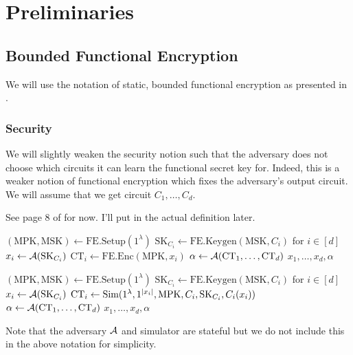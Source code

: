 \newcommand{\MPK}{\text{MPK}}
\newcommand{\MSK}{\text{MSK}}
\newcommand{\SK}{\text{SK}}
\newcommand{\Enc}{\texttt{Enc}}
\newcommand{\Dec}{\texttt{Dec}}
\newcommand{\FEEnc}{\text{FE.Enc}}
\newcommand{\FEDec}{\text{FE.Dec}}
\newcommand{\FESetup}{\text{FE.Setup}}
\newcommand{\FEKeygen}{\text{FE.Keygen}}
\newcommand{\FECT}{\text{CT}}


\section{Preliminaries}
\subsection{Bounded Functional Encryption}
We will use the notation of static, bounded functional encryption as presented in
\cite{agrawal2017functional}.

\subsubsection*{Security}
We will slightly weaken the security notion such that the adversary does not choose
which circuits it can learn the functional secret key for. Indeed, this is a weaker notion of functional encryption
which fixes the adversary's output circuit.
We will assume that we get circuit $C_1, \dots, C_d$.

See page 8 of \cite{agrawal2017functional} for now. I'll put in the actual definition later.


\begin{minipage}{0.46\textwidth}
\begin{algorithm}[H]
    \centering
    \caption{$\ExpReal(1^\lambda)$}
    \begin{algorithmic}[1]
        \State $(\MPK, \MSK) \gets \FESetup(1^\lambda)$
				\State $\SK_{C_i} \gets \FEKeygen(\MSK, C_i)$ for $i \in [d]$
				\State $x_i \gets \advers(\SK_{C_i})$
				\State $\FECT_i \gets \FEEnc(\MPK, x_i)$
				\State $\alpha \gets \advers(\FECT_1, \dots, \FECT_d)$
				\State \Return $x_1, \dots, x_d, \alpha$
    \end{algorithmic}
		\label{alg:FEExprReal}
\end{algorithm}
\end{minipage}
\hfill
\begin{minipage}{0.46\textwidth}
\begin{algorithm}[H]
    \centering
    \caption{$\ExpSim(1^\lambda)$}\label{alg:FEExprSim}
    \begin{algorithmic}[1]
        \State $(\MPK, \MSK) \gets \FESetup(1^\lambda)$
				\State $\SK_{C_i} \gets \FEKeygen(\MSK, C_i)$ for $i \in [d]$
				\State $x_i \gets \advers(\SK_{C_i})$
				\State $\FECT_i \gets \Sim(1^\lambda, 1^{|x_i|}, \MPK, C_i, \SK_{C_i}, C_i(x_i))$
				\State $\alpha \gets \advers(\FECT_1, \dots, \FECT_d)$
				\State \Return $x_1, \dots, x_d, \alpha$
    \end{algorithmic}
\end{algorithm}
\end{minipage}

Note that the adversary $\mathcal{A}$ and simulator are stateful but we do not include this in the above notation for simplicity.
